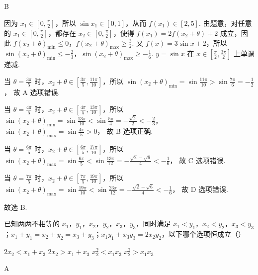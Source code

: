 \begin{answer}
B
\end{answer}

\begin{solution}
因为 \(x_1\in\left[ 0,\frac{\pi}{2} \right]\)，所以 \(\sin x_1\in[0,1]\)，从而 \(f(x_1)\in[2,5]\). 由题意，对任意的 \(x_1\in\left[ 0,\frac{\pi}{2} \right]\)，都存在 \(x_2\in\left[ 0,\frac{\pi}{2} \right]\)，使得 \(f(x_1)=2f(x_2+\theta)+2\) 成立，因此 \(f(x_2+\theta)_{\min}\le 0\)，\(f(x_2+\theta)_{\max}\ge \frac32\). 又 \(f(x)=3\sin x+2\)，所以 \(\sin(x_2+\theta)_{\min}\le -\frac23\)，\(\sin(x_2+\theta)_{\max}\ge -\frac16\). \(y=\sin x\) 在 \(x\in\left[ \frac{\pi}{2},\frac{3\pi}{2} \right]\) 上单调递减.

当 \(\theta=\frac{3\pi}{5}\) 时，\(x_2+\theta\in\left[ \frac{3\pi}{5},\frac{11\pi}{10} \right]\)，所以 \(\sin(x_2+\theta)_{\min}=\sin\frac{11\pi}{10}>\sin\frac{7\pi}{6}=-\frac12\)，
故 A 选项错误.

当 \(\theta=\frac{4\pi}{5}\) 时，\(x_2+\theta\in\left[ \frac{4\pi}{5},\frac{13\pi}{10} \right]\)，所以 \(\sin(x_2+\theta)_{\min}=\sin\frac{13\pi}{10}<\sin\frac{5\pi}{4}=-\frac{\sqrt2}{2}<-\frac23\)，\(\sin(x_2+\theta)_{\max}=\sin\frac{4\pi}{5}>0\)，
故 B 选项正确.

当 \(\theta=\frac{6\pi}{5}\) 时，\(x_2+\theta\in\left[ \frac{6\pi}{5},\frac{17\pi}{10} \right]\)，所以 \(\sin(x_2+\theta)_{\max}=\sin\frac{6\pi}{5}<\sin\frac{13\pi}{12}=-\frac{\sqrt2-\sqrt6}{4}<-\frac16\)，
故 C 选项错误.

当 \(\theta=\frac{7\pi}{5}\) 时，\(x_2+\theta\in\left[ \frac{7\pi}{5},\frac{19\pi}{10} \right]\)，所以 \(\sin(x_2+\theta)_{\max}=\sin\frac{19\pi}{10}<\sin\frac{23\pi}{12}=-\frac{\sqrt2-\sqrt6}{4}<-\frac16\)，
故 D 选项错误.

故选 B.
\end{solution}

\begin{problem}
已知两两不相等的 \(x_1\)，\(y_1\)，\(x_2\)，\(y_2\)，\(x_3\)，\(y_3\)，同时满足 \(x_1<y_1\)，\(x_2<y_2\)，\(x_3<y_3\)；\(x_1+y_1=x_2+y_2=x_3+y_3\)；\(x_1y_1+x_3y_3=2x_2y_2\)，以下哪个选项恒成立（\quad）

\choices
    {\(2x_2<x_1+x_3\)}
    {\(2x_2>x_1+x_3\)}
    {\(x_2^2<x_1x_3\)}
    {\(x_2^2>x_1x_3\)}
\end{problem}

\begin{answer}
A
\end{answer}

